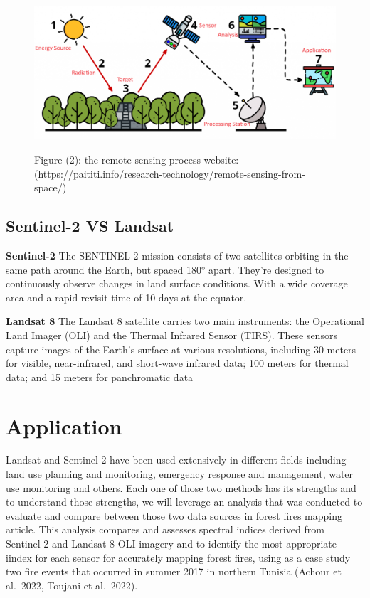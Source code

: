 \documentclass[
  letterpaper,
  DIV=11,
  numbers=noendperiod]{scrreprt}
\begin{document}
\begin{figure}

{\centering 

\href{https://paititi.info/research-technology/remote-sensing-from-space/}{\includegraphics[width=5.20833in,height=\textheight]{4-1-Remote-Sensing-Process-1024x455.png}}

}

\caption{Figure (2): the remote sensing process website:
(https://paititi.info/research-technology/remote-sensing-from-space/)}

\end{figure}

\hypertarget{sentinel-2-vs-landsat}{%
\subsection{Sentinel-2 VS Landsat}\label{sentinel-2-vs-landsat}}

\textbf{Sentinel-2} The SENTINEL-2 mission consists of two satellites
orbiting in the same path around the Earth, but spaced 180° apart.
They're designed to continuously observe changes in land surface
conditions. With a wide coverage area and a rapid revisit time of 10
days at the equator.

\textbf{Landsat 8} The Landsat 8 satellite carries two main instruments:
the Operational Land Imager (OLI) and the Thermal Infrared Sensor
(TIRS). These sensors capture images of the Earth's surface at various
resolutions, including 30 meters for visible, near-infrared, and
short-wave infrared data; 100 meters for thermal data; and 15 meters for
panchromatic data

\hypertarget{application}{%
\section{Application}\label{application}}

Landsat and Sentinel 2 have been used extensively in different fields
including land use planning and monitoring, emergency response and
management, water use monitoring and others. Each one of those two
methods has its strengths and to understand those strengths, we will
leverage an analysis that was conducted to evaluate and compare between
those two data sources in forest fires mapping article. This analysis
compares and assesses spectral indices derived from Sentinel-2 and
Landsat-8 OLI imagery and to identify the most appropriate iindex for
each sensor for accurately mapping forest fires, using as a case study
two fire events that occurred in summer 2017 in northern Tunisia (Achour
et al.~2022, Toujani et al.~2022).
\end{document}
